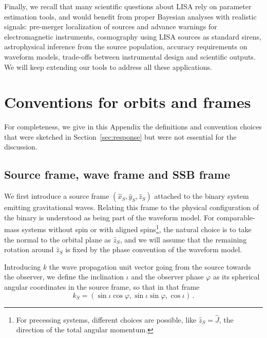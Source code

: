 \documentclass[aps,showpacs,twocolumn,prd,superscriptaddress,nofootinbib]{revtex4-1}
\newcommand{\be}{\begin{equation}}
\newcommand{\ee}{\end{equation}}
\begin{document}
Finally, we recall that many scientific questions about LISA rely on parameter estimation tools, and would benefit from proper Bayesian analyses with realistic signals: pre-merger localization of sources and advance warnings for electromagnetic instruments, cosmography using LISA sources as standard sirens, astrophysical inference from the source population, accuracy requirements on waveform models, trade-offs between instrumental design and scientific outputs. We will keep extending our tools to address all these applications.



\appendix


\section{Conventions for orbits and frames}
\label{app:conventions}

For completeness, we give in this Appendix the definitions and convention choices that were sketched in Section~\ref{sec:response} but were not essential for the discussion.


\subsection{Source frame, wave frame and SSB frame}
\label{app:wavessbframe}

We first introduce a source frame $(\hat{x}_{S}, \hat{y}_{S}, \hat{z}_{S})$ attached to the binary system emitting gravitational waves. Relating this frame to the physical configuration of the binary is understood as being part of the waveform model. For comparable-mass systems without spin or with aligned spins\footnote{For precessing systems, different choices are possible, like $\hat{z}_{S} = \hat{J}$, the direction of the total angular momentum.}, the natural choice is to take the normal to the orbital plane as $\hat{z}_{S}$, and we will assume that the remaining rotation around $\hat{z}_{S}$ is fixed by the phase convention of the waveform model.

Introducing $k$ the wave propagation unit vector going from the source towards the observer, we define the inclination $\iota$ and the observer phase $\varphi$ as its spherical angular coordinates in the source frame, so that in that frame
\be
	k_{S} = (\sin\iota \cos\varphi, \sin\iota \sin\varphi, \cos\iota) \,.
\ee
\end{document}
